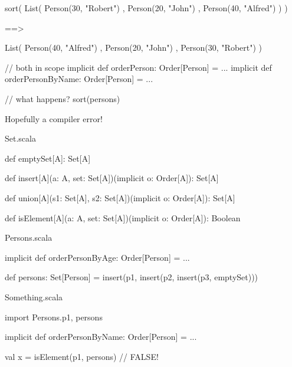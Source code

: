 \documentclass[usenames,dvipsnames,svgnames,table,aspectratio=169,mathserif]{beamer}
\newcommand{\nl}{\vspace{\baselineskip}}
\newcommand{\pnl}{\pause \nl}
\begin{document}
\begin{frame}[fragile]
\begin{scalacode}
sort(
  List(
    Person(30, "Robert")
  , Person(20, "John")
  , Person(40, "Alfred")
  )
)
\end{scalacode}

\pnl

\begin{scalacode}
==>

List(
  Person(40, "Alfred")
, Person(20, "John")
, Person(30, "Robert")
)

\end{scalacode}
\end{frame}


\begin{frame}[fragile]
\begin{scalacode}
// both in scope
implicit def orderPerson: Order[Person] = ...
implicit def orderPersonByName: Order[Person] = ...

// what happens?
sort(persons)
\end{scalacode}

\pnl

Hopefully a compiler error!
\end{frame}


\begin{frame}[fragile]
\begin{block}{Set.scala}
\begin{scalacode}
def emptySet[A]: Set[A]

def insert[A](a: A, set: Set[A])(implicit o: Order[A]): Set[A]

def union[A](s1: Set[A], s2: Set[A])(implicit o: Order[A]): Set[A]

def isElement[A](a: A, set: Set[A])(implicit o: Order[A]): Boolean
\end{scalacode}
\end{block}
\end{frame}


\begin{frame}[fragile]
\begin{block}{Persons.scala}
\begin{scalacode}
implicit def orderPersonByAge: Order[Person] = ...

def persons: Set[Person] =
  insert(p1, insert(p2, insert(p3, emptySet)))
\end{scalacode}
\end{block}

\nl

\begin{block}{Something.scala}
\begin{scalacode}
import Persons.{p1, persons}

implicit def orderPersonByName: Order[Person] = ...

val x = isElement(p1, persons) // FALSE!
\end{scalacode}
\end{block}
\end{frame}
\end{document}
